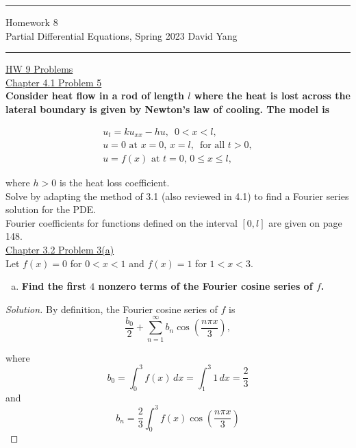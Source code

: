 \documentclass[11pt]{article}
\newenvironment{solution}
  {\renewcommand\qedsymbol{$\blacksquare$}\begin{proof}[Solution]}
  {\end{proof}}
\begin{document}
	\hrule
	\begin{center}
		{\Large Homework 8} \\ %
		\vspace{0.2cm}
		Partial Differential Equations, Spring 2023 \hfill David Yang %
	\end{center}

\hrule

\vspace{1em}


\underline{HW 9 Problems} \\

\underline{Chapter 4.1 Problem 5} \\

\textbf{Consider heat flow in a rod of length $l$ where the heat is lost across the lateral boundary is given by Newton's law of cooling. The model is} 

\[
\begin{array}{c}
    u_t = ku_{xx} - hu, \,\,\, 0 < x < l, \\
    u = 0 \text{ at } x =0, \, x=l, \, \text{ for all } t > 0,\\
    u = f(x) \text { at } t=0, \, 0 \leq x \leq l,
\end{array}
\]

where $h > 0$ is the heat loss coefficient. \\

Solve by adapting the method of 3.1 (also reviewed in 4.1) to find a Fourier series solution for the PDE. \\

Fourier coefficients for functions defined on the interval $[0, l]$ are given on page 148. \\

\underline{Chapter 3.2 Problem 3(a)} \\

Let $f(x)=0$ for $0<x<1$ and $f(x)=1$ for $1<x<3$. 
\begin{enumerate}[a)] 
    \item \textbf{Find the first $4$ nonzero terms of the Fourier cosine series of $f$.}
  
\end{enumerate}

\begin{solution}
By definition, the Fourier cosine series of $f$ is \[ \frac{b_0}{2} + \sum\limits_{n=1}^{\infty} b_n \cos\left(\frac{n\pi x}{3}\right),\]

where \[b_0 = \int_{0}^{3} f(x) \, dx = \int_{1}^3 1 \, dx = \frac{2}{3}\] and \[ b_n = \frac{2}{3} \int_0^3 f(x) \cos\left(\frac{n\pi x}{3}\right)\] 
\end{solution}
\end{document}
